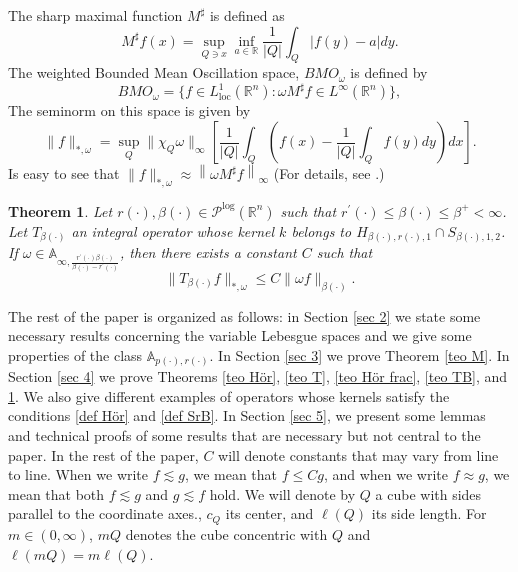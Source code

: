 \documentclass[a4paper,11pt,reqno]{amsart}
\theoremstyle{plain}
\numberwithin{equation}{section}
\newtheorem{teo}{Theorem}[section]
\theoremstyle{definition}
\newcommand{\R}{{\mathbb{R}^n}}
\begin{document}
The sharp maximal function $M^\sharp$ is defined as
\begin{equation*}
M^\sharp f(x)=\sup_{Q\ni x}\inf_{a\in\mathbb{R}}\frac{1}{|Q|}\int_Q |f(y)-a|dy.
\end{equation*}
The weighted Bounded Mean Oscillation space, $BMO_\omega$ is defined by
\begin{equation*}
	BMO_\omega=\{f\in L^1_{\text{loc}}(\R): \omega M^\sharp f\in L^{\infty}(\R) \},
\end{equation*}
The seminorm on this space is given by
\begin{equation*}
\|f\|_{*,\omega}=\sup_Q \|\chi_Q\omega\|_\infty\left[\frac{1}{|Q|}\int_Q\left(f(x)-\frac{1}{|Q|}\int_Qf(y)dy\right)dx\right].
\end{equation*}
Is easy to see that $\|f\|_{*,\omega}\approx\left\|\omega M^\sharp f\right\|_\infty$ (For details, see \cite{BMOw}.)
\begin{teo}\label{borde}
	Let ${r(\cdot)},{\beta(\cdot)}\in\mathcal{P}^{\text{log}}(\R)$ such that $r^\prime(\cdot)\leq\beta(\cdot)\leq \beta^+<\infty$. Let $T_{\beta(\cdot)}$ an integral operator whose kernel $k$ belongs to $H_{{\beta(\cdot)},{r(\cdot)},1}\cap S_{{\beta(\cdot)},1,2}$. If $\omega\in \mathbb{A}_{\infty,\frac{{r^\prime(\cdot)}{\beta(\cdot)}}{{\beta(\cdot)}-{r^\prime(\cdot)}}}$, then there exists a constant $C$ such that
	\begin{equation*}
	\|T_{\beta(\cdot)}f\|_{*,\omega}\leq C \|\omega f\|_{\beta(\cdot)}.
	\end{equation*}
\end{teo}



The rest of the paper is organized as follows:
in Section \ref{sec 2} we state some necessary results concerning the variable Lebesgue spaces and we give some properties of the class $\mathbb{A}_{p(\cdot),r(\cdot)}$. In Section \ref{sec 3} we prove Theorem \ref{teo M}. In Section \ref{sec 4} we prove Theorems \ref{teo Hör}, \ref{teo T}, \ref{teo Hör frac}, \ref{teo TB}, and \ref{borde}. We also give different examples of operators whose kernels satisfy the conditions \ref{def Hör} and \ref{def SrB}. In Section \ref{sec 5}, we present some lemmas and technical proofs of some results that are necessary but not central to the paper. In the rest of the paper, $C$ will denote constants that may vary from line to line. When we write $f\lesssim g$, we mean that  $f\leq C g$, and when we write $f\approx g$, we mean that both $f\lesssim g$ and $g\lesssim f$ hold. We will denote by $Q$ a cube with sides parallel to the coordinate axes., $c_Q$ its center, and $\ell(Q)$ its side length.
 For $m\in(0,\infty)$, $mQ$ denotes the cube concentric with $Q$ and $\ell(mQ)=m\ell(Q)$. 
\end{document}
